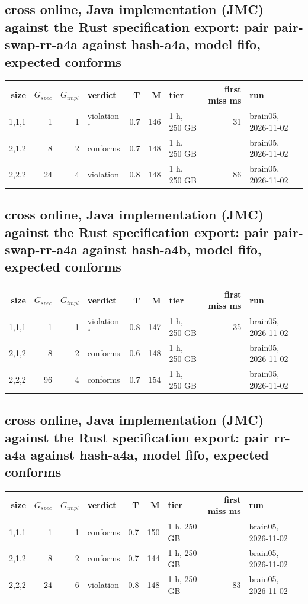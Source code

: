 \documentclass[10pt]{article}
\begin{document}
\subsection*{cross online, Java implementation (JMC) against the Rust specification export: pair \textsf{pair-swap-rr-a4a} against \textsf{hash-a4a}, model fifo, expected conforms}
\begin{longtable}{@{}rrrlrrlrl@{}}
\toprule
size & $G_{\mathit{spec}}$ & $G_{\mathit{impl}}$ & verdict & T & M & tier & first miss ms & run \\
\midrule
\endhead
\color{red} 1,1,1 & 1 & 1 & violation$^{\ast}$ & 0.7 & 146 & 1 h, 250 GB & 31 & brain05, 2026-11-02 \\
\color{red} 2,1,2 & 8 & 2 & conforms & 0.7 & 148 & 1 h, 250 GB &  & brain05, 2026-11-02 \\
\color{red} 2,2,2 & 24 & 4 & violation & 0.8 & 148 & 1 h, 250 GB & 86 & brain05, 2026-11-02 \\
\bottomrule
\end{longtable}
\subsection*{cross online, Java implementation (JMC) against the Rust specification export: pair \textsf{pair-swap-rr-a4a} against \textsf{hash-a4b}, model fifo, expected conforms}
\begin{longtable}{@{}rrrlrrlrl@{}}
\toprule
size & $G_{\mathit{spec}}$ & $G_{\mathit{impl}}$ & verdict & T & M & tier & first miss ms & run \\
\midrule
\endhead
\color{red} 1,1,1 & 1 & 1 & violation$^{\ast}$ & 0.8 & 147 & 1 h, 250 GB & 35 & brain05, 2026-11-02 \\
\color{red} 2,1,2 & 8 & 2 & conforms & 0.6 & 148 & 1 h, 250 GB &  & brain05, 2026-11-02 \\
\color{red} 2,2,2 & 96 & 4 & conforms & 0.7 & 154 & 1 h, 250 GB &  & brain05, 2026-11-02 \\
\bottomrule
\end{longtable}
\subsection*{cross online, Java implementation (JMC) against the Rust specification export: pair \textsf{rr-a4a} against \textsf{hash-a4a}, model fifo, expected conforms}
\begin{longtable}{@{}rrrlrrlrl@{}}
\toprule
size & $G_{\mathit{spec}}$ & $G_{\mathit{impl}}$ & verdict & T & M & tier & first miss ms & run \\
\midrule
\endhead
\color{red} 1,1,1 & 1 & 1 & conforms & 0.7 & 150 & 1 h, 250 GB &  & brain05, 2026-11-02 \\
\color{red} 2,1,2 & 8 & 2 & conforms & 0.7 & 144 & 1 h, 250 GB &  & brain05, 2026-11-02 \\
\color{red} 2,2,2 & 24 & 6 & violation & 0.8 & 148 & 1 h, 250 GB & 83 & brain05, 2026-11-02 \\
\bottomrule
\end{longtable}
\end{document}
